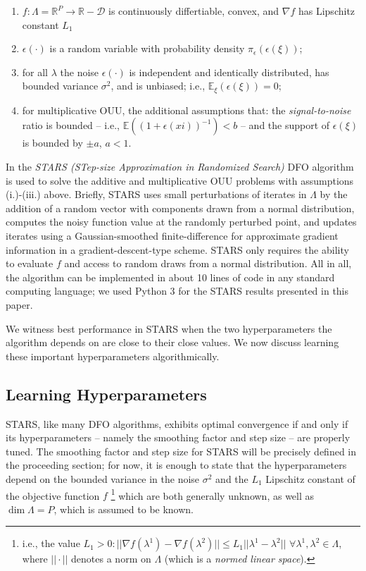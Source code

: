 \documentclass{amsart}
\newcommand{\D}{\mathcal{D}}
\newcommand{\R}{\mathbb{R}}
\begin{document}
\begin{enumerate}[(i.)]

\item $f: \Lambda=\R^P \to \R-\D$ is continuously differtiable, convex, and $\nabla f$ has Lipschitz constant $L_1$

\item $\epsilon(\cdot)$ is a random variable with probability density $\pi_{\epsilon}(\epsilon(\xi))$;

\item for all $\lambda$ the noise $\epsilon(\cdot)$ is independent and identically distributed, has bounded variance $\sigma^2$, and is unbiased; i.e., $\mathbb{E}_\xi (\epsilon(\xi))=0$;

\item for multiplicative OUU, the additional assumptions that: the \textit{signal-to-noise} ratio is bounded -- i.e., $\mathbb{E}((1+\epsilon(xi))^{-1})<b$ -- and the support of $\epsilon(\xi)$ is bounded by $\pm a$, $a<1.$



\end{enumerate}




In \cite{CW} the \textit{STARS (STep-size Approximation in Randomized Search)} DFO algorithm is used to solve the additive and multiplicative OUU problems with assumptions (i.)-(iii.) above. Briefly, STARS uses small perturbations of iterates in $\Lambda$ by the addition of a random vector with components drawn from a normal distribution, computes the noisy function value at the randomly perturbed point, and updates iterates using a Gaussian-smoothed finite-difference for approximate gradient information in a gradient-descent-type scheme. STARS only  requires the ability to evaluate $f$ and access to random draws from a normal distribution. All in all, the algorithm can be implemented in about 10 lines of code in any standard computing language; we used Python 3 for the STARS results presented in this paper. 

We witness best performance in STARS when the two hyperparameters the algorithm depends on are close to their close values. We now discuss learning these important hyperparameters algorithmically.


\subsection{Learning Hyperparameters} 
STARS, like many DFO algorithms, exhibits optimal convergence if and only if its hyperparameters -- namely the smoothing factor and step size -- are properly tuned. The smoothing factor and step size for STARS will be precisely defined in the proceeding section; for now, it is enough to state that the hyperparameters depend on the bounded variance in the noise $\sigma^2$ and the $L_1$ Lipschitz constant of the objective function $f$ 
\footnote{i.e., the value $L_1> 0: ||\nabla f(\lambda^1)-\nabla f(\lambda^2)|| \leq L_1 ||\lambda^1 -\lambda^2||$ $\forall \lambda^1, \lambda^2 \in \Lambda$, where $||\cdot||$ denotes a norm on $\Lambda$ (which is a \textit{normed linear space}).}
which are both generally unknown, as well as $\dim \Lambda=P$, which is assumed to be known. 
\end{document}

